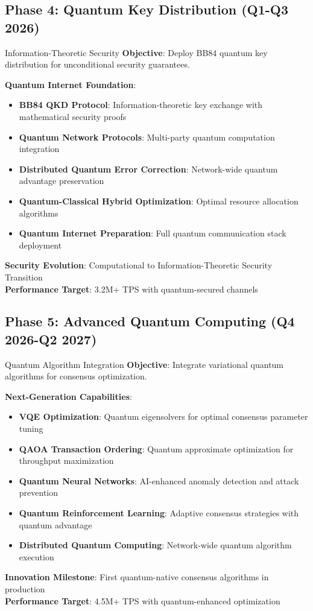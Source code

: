 \documentclass[11pt,a4paper]{article}
\begin{document}
\subsection{Phase 4: Quantum Key Distribution (Q1-Q3 2026)}

\begin{phasebox}{Information-Theoretic Security}
\textbf{Objective}: Deploy BB84 quantum key distribution for unconditional security guarantees.

\textbf{Quantum Internet Foundation}:
\begin{itemize}
\item \textbf{BB84 QKD Protocol}: Information-theoretic key exchange with mathematical security proofs
\item \textbf{Quantum Network Protocols}: Multi-party quantum computation integration
\item \textbf{Distributed Quantum Error Correction}: Network-wide quantum advantage preservation
\item \textbf{Quantum-Classical Hybrid Optimization}: Optimal resource allocation algorithms
\item \textbf{Quantum Internet Preparation}: Full quantum communication stack deployment
\end{itemize}

\textbf{Security Evolution}: Computational to Information-Theoretic Security Transition\\
\textbf{Performance Target}: 3.2M+ TPS with quantum-secured channels
\end{phasebox}

\subsection{Phase 5: Advanced Quantum Computing (Q4 2026-Q2 2027)}

\begin{phasebox}{Quantum Algorithm Integration}
\textbf{Objective}: Integrate variational quantum algorithms for consensus optimization.

\textbf{Next-Generation Capabilities}:
\begin{itemize}
\item \textbf{VQE Optimization}: Quantum eigensolvers for optimal consensus parameter tuning
\item \textbf{QAOA Transaction Ordering}: Quantum approximate optimization for throughput maximization
\item \textbf{Quantum Neural Networks}: AI-enhanced anomaly detection and attack prevention
\item \textbf{Quantum Reinforcement Learning}: Adaptive consensus strategies with quantum advantage
\item \textbf{Distributed Quantum Computing}: Network-wide quantum algorithm execution
\end{itemize}

\textbf{Innovation Milestone}: First quantum-native consensus algorithms in production\\
\textbf{Performance Target}: 4.5M+ TPS with quantum-enhanced optimization
\end{phasebox}
\end{document}
